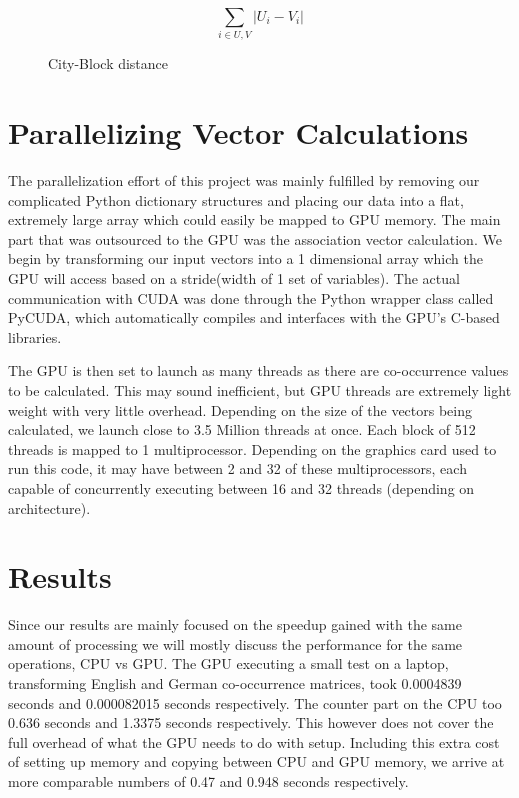 \documentclass[12pt]{article}
\begin{document}
\begin{figure}
$$\sum_{i\in U,V} |U_i - V_i| $$
\caption{City-Block distance}
  \label{cityblock}
\end{figure}

\section{Parallelizing Vector Calculations}

The parallelization effort of this project was mainly fulfilled by removing our complicated Python dictionary structures and placing our data into a flat, extremely large array which could easily be mapped to GPU memory. The main part that was outsourced to the GPU was the association vector calculation. We begin by transforming our input vectors into a 1 dimensional array which the GPU will access based on a stride(width of 1 set of variables). The actual communication with CUDA was done through the Python wrapper class called PyCUDA, which automatically compiles and interfaces with the GPU's C-based libraries.

The GPU is then set to launch as many threads as there are co-occurrence values to be calculated. This may sound inefficient, but GPU threads are extremely light weight with very little overhead. Depending on the size of the vectors being calculated, we launch close to 3.5 Million threads at once. Each block of 512 threads is mapped to 1 multiprocessor. Depending on the graphics card used to run this code, it may have between 2 and 32 of these multiprocessors, each capable of concurrently executing between 16 and 32 threads (depending on architecture).

\section{Results}

Since our results are mainly focused on the speedup gained with the same amount of processing we will mostly discuss the performance for the same operations, CPU vs GPU. The GPU executing a small test on a laptop, transforming English and German co-occurrence matrices, took 0.0004839 seconds and 0.000082015 seconds respectively. The counter part on the CPU too 0.636 seconds and 1.3375 seconds respectively. This however does not cover the full overhead of what the GPU needs to do with setup. Including this extra cost of setting up memory and copying between CPU and GPU memory, we arrive at more comparable numbers of 0.47 and 0.948 seconds respectively.
\end{document}
